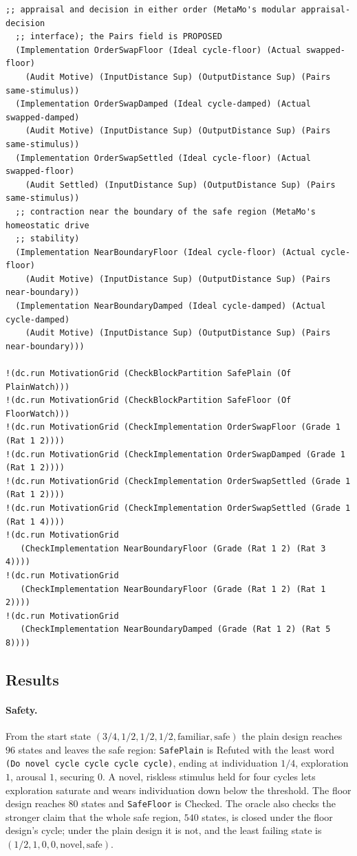 \documentclass[11pt]{article}
\newcommand{\code}[1]{\texttt{#1}}
\theoremstyle{definition}
\theoremstyle{plain}
\begin{document}
\begin{lstlisting}[style=mettamod]
  ;; appraisal and decision in either order (MetaMo's modular appraisal-decision
  ;; interface); the Pairs field is PROPOSED
  (Implementation OrderSwapFloor (Ideal cycle-floor) (Actual swapped-floor)
    (Audit Motive) (InputDistance Sup) (OutputDistance Sup) (Pairs same-stimulus))
  (Implementation OrderSwapDamped (Ideal cycle-damped) (Actual swapped-damped)
    (Audit Motive) (InputDistance Sup) (OutputDistance Sup) (Pairs same-stimulus))
  (Implementation OrderSwapSettled (Ideal cycle-floor) (Actual swapped-floor)
    (Audit Settled) (InputDistance Sup) (OutputDistance Sup) (Pairs same-stimulus))
  ;; contraction near the boundary of the safe region (MetaMo's homeostatic drive
  ;; stability)
  (Implementation NearBoundaryFloor (Ideal cycle-floor) (Actual cycle-floor)
    (Audit Motive) (InputDistance Sup) (OutputDistance Sup) (Pairs near-boundary))
  (Implementation NearBoundaryDamped (Ideal cycle-damped) (Actual cycle-damped)
    (Audit Motive) (InputDistance Sup) (OutputDistance Sup) (Pairs near-boundary)))

!(dc.run MotivationGrid (CheckBlockPartition SafePlain (Of PlainWatch)))
!(dc.run MotivationGrid (CheckBlockPartition SafeFloor (Of FloorWatch)))
!(dc.run MotivationGrid (CheckImplementation OrderSwapFloor (Grade 1 (Rat 1 2))))
!(dc.run MotivationGrid (CheckImplementation OrderSwapDamped (Grade 1 (Rat 1 2))))
!(dc.run MotivationGrid (CheckImplementation OrderSwapSettled (Grade 1 (Rat 1 2))))
!(dc.run MotivationGrid (CheckImplementation OrderSwapSettled (Grade 1 (Rat 1 4))))
!(dc.run MotivationGrid
   (CheckImplementation NearBoundaryFloor (Grade (Rat 1 2) (Rat 3 4))))
!(dc.run MotivationGrid
   (CheckImplementation NearBoundaryFloor (Grade (Rat 1 2) (Rat 1 2))))
!(dc.run MotivationGrid
   (CheckImplementation NearBoundaryDamped (Grade (Rat 1 2) (Rat 5 8))))
\end{lstlisting}

\subsection{Results}

\paragraph{Safety.} From the start state $(3/4, 1/2, 1/2, 1/2, \text{familiar}, \text{safe})$ the
plain design reaches $96$ states and leaves the safe region: \code{SafePlain} is Refuted with the
least word \code{(Do novel cycle cycle cycle cycle)}, ending at individuation $1/4$, exploration
$1$, arousal $1$, securing $0$. A novel, riskless stimulus held for four cycles lets exploration
saturate and wears individuation down below the threshold. The floor design reaches $80$ states and
\code{SafeFloor} is Checked. The oracle also checks the stronger claim that the whole safe region,
$540$ states, is closed under the floor design's cycle; under the plain design it is not, and the
least failing state is $(1/2, 1, 0, 0, \text{novel}, \text{safe})$.
\end{document}
